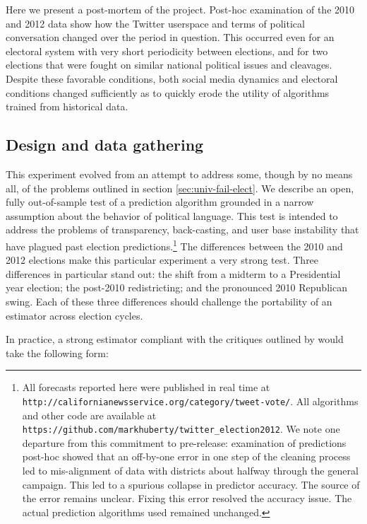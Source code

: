 \documentclass{article}
\begin{document}
Here we present a post-mortem of the project. Post-hoc examination of
the 2010 and 2012 data show how the Twitter userspace and terms of
political conversation changed over the period in question. This
occurred even for an electoral system with very short periodicity
between elections, and for two elections that were fought on similar
national political issues and cleavages. Despite these favorable
conditions, both social media dynamics and electoral conditions
changed sufficiently as to quickly erode the utility of algorithms
trained from historical data. 

\subsection{Design and data gathering}
\label{sec:design-data-gath}

This experiment evolved from an attempt to address some, though by no means
all, of the problems outlined in section \ref{sec:univ-fail-elect}. We describe an open, fully out-of-sample test
of a prediction algorithm grounded in a narrow assumption about the
behavior of political language. This test is intended to address the
problems of transparency, back-casting, and user base instability that
have plagued past election predictions.\footnote{All forecasts reported here were published in
real time at \texttt{http://californianewsservice.org/category/tweet-vote/}.  All
algorithms and other code are available at
\texttt{https://github.com/markhuberty/twitter\_election2012}. We note one departure from this commitment to
  pre-release: examination of predictions post-hoc showed that an
  off-by-one error in one step of the cleaning process led to
  mis-alignment of data with districts about halfway through the general
  campaign. This led to a spurious collapse in predictor accuracy. The
  source of the error remains unclear. Fixing this error resolved the
  accuracy issue. The actual prediction algorithms used remained
  unchanged.} 
The differences between the 2010 and 2012 elections make this
particular experiment a very strong test. Three differences in
particular stand out: the shift from a midterm to a Presidential year
election; the post-2010 redistricting; and the pronounced 2010
Republican swing. Each of these three differences should challenge the
portability of an estimator across election cycles.

In practice, a strong estimator compliant with the critiques outlined
by \cite{metaxas2011not} would take the following form:
\end{document}
